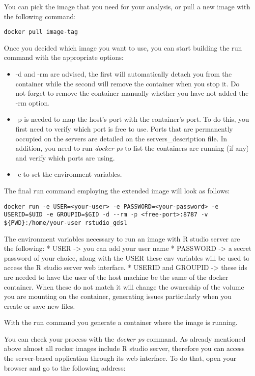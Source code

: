 \documentclass[
]{book}
\providecommand{\tightlist}{%
  \setlength{\itemsep}{0pt}\setlength{\parskip}{0pt}}
\begin{document}
You can pick the image that you need for your analysis, or pull a new image with the following command:

\begin{verbatim}
docker pull image-tag
\end{verbatim}

Once you decided which image you want to use, you can start building the run command with the appropriate options:

\begin{itemize}
\tightlist
\item
  -d and -rm are advised, the first will automatically detach you from the container while the second will remove the container when you stop it. Do not forget to remove the container manually whether you have not added the -rm option.
\item
  -p is needed to map the host's port with the container's port. To do this, you first need to verify which port is free to use. Ports that are permanently occupied on the servers are detailed on the servers\_description file. In addition, you need to run \emph{docker ps} to list the containers are running (if any) and verify which ports are using.
\item
  -e to set the environment variables.
\end{itemize}

The final run command employing the extended image will look as follows:

\begin{verbatim}
docker run -e USER=<your-user> -e PASSWORD=<your-password> -e USERID=$UID -e GROUPID=$GID -d --rm -p <free-port>:8787 -v ${PWD}:/home/your-user rstudio_gdsl
\end{verbatim}

The environment variables necessary to run an image with R studio server are the following:
* USER -\textgreater{} you can add your user name
* PASSWORD -\textgreater{} a secret password of your choice, along with the USER these env variables will be used to access the R studio server web interface.
* USERID and GROUPID -\textgreater{} these ids are needed to have the user of the host machine be the same of the docker container. When these do not match it will change the ownership of the volume you are mounting on the container, generating issues particularly when you create or save new files.

With the run command you generate a container where the image is running.

You can check your process with the \emph{docker ps} command. As already mentioned above almost all rocker images include R studio server, therefore you can access the server-based application through its web interface. To do that, open your browser and go to the following address:
\end{document}
